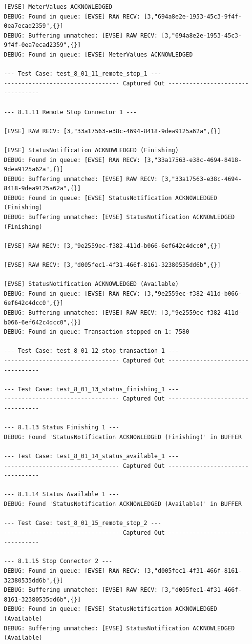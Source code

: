 \documentclass{article}
\begin{document}
\begin{lstlisting}
[EVSE] MeterValues ACKNOWLEDGED
DEBUG: Found in queue: [EVSE] RAW RECV: [3,"694a8e2e-1953-45c3-9f4f-0ea7ecad2359",{}]
DEBUG: Buffering unmatched: [EVSE] RAW RECV: [3,"694a8e2e-1953-45c3-9f4f-0ea7ecad2359",{}]
DEBUG: Found in queue: [EVSE] MeterValues ACKNOWLEDGED

--- Test Case: test_8_01_11_remote_stop_1 ---
--------------------------------- Captured Out ---------------------------------

--- 8.1.11 Remote Stop Connector 1 ---

[EVSE] RAW RECV: [3,"33a17563-e38c-4694-8418-9dea9125a62a",{}]

[EVSE] StatusNotification ACKNOWLEDGED (Finishing)
DEBUG: Found in queue: [EVSE] RAW RECV: [3,"33a17563-e38c-4694-8418-9dea9125a62a",{}]
DEBUG: Buffering unmatched: [EVSE] RAW RECV: [3,"33a17563-e38c-4694-8418-9dea9125a62a",{}]
DEBUG: Found in queue: [EVSE] StatusNotification ACKNOWLEDGED (Finishing)
DEBUG: Buffering unmatched: [EVSE] StatusNotification ACKNOWLEDGED (Finishing)

[EVSE] RAW RECV: [3,"9e2559ec-f382-411d-b066-6ef642c4dcc0",{}]

[EVSE] RAW RECV: [3,"d005fec1-4f31-466f-8161-32380535dd6b",{}]

[EVSE] StatusNotification ACKNOWLEDGED (Available)
DEBUG: Found in queue: [EVSE] RAW RECV: [3,"9e2559ec-f382-411d-b066-6ef642c4dcc0",{}]
DEBUG: Buffering unmatched: [EVSE] RAW RECV: [3,"9e2559ec-f382-411d-b066-6ef642c4dcc0",{}]
DEBUG: Found in queue: Transaction stopped on 1: 7580

--- Test Case: test_8_01_12_stop_transaction_1 ---
--------------------------------- Captured Out ---------------------------------

--- Test Case: test_8_01_13_status_finishing_1 ---
--------------------------------- Captured Out ---------------------------------

--- 8.1.13 Status Finishing 1 ---
DEBUG: Found 'StatusNotification ACKNOWLEDGED (Finishing)' in BUFFER

--- Test Case: test_8_01_14_status_available_1 ---
--------------------------------- Captured Out ---------------------------------

--- 8.1.14 Status Available 1 ---
DEBUG: Found 'StatusNotification ACKNOWLEDGED (Available)' in BUFFER

--- Test Case: test_8_01_15_remote_stop_2 ---
--------------------------------- Captured Out ---------------------------------

--- 8.1.15 Stop Connector 2 ---
DEBUG: Found in queue: [EVSE] RAW RECV: [3,"d005fec1-4f31-466f-8161-32380535dd6b",{}]
DEBUG: Buffering unmatched: [EVSE] RAW RECV: [3,"d005fec1-4f31-466f-8161-32380535dd6b",{}]
DEBUG: Found in queue: [EVSE] StatusNotification ACKNOWLEDGED (Available)
DEBUG: Buffering unmatched: [EVSE] StatusNotification ACKNOWLEDGED (Available)


\end{lstlisting}
\end{document}

